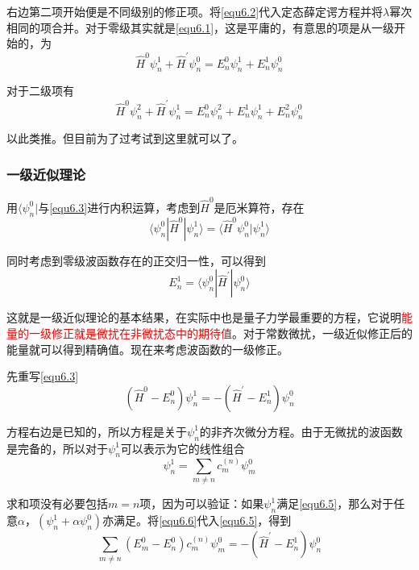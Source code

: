 \documentclass[UTF8]{ctexart}
\newcommand{\red}{\textcolor{red}}
\begin{document}
\noindent 右边第二项开始便是不同级别的修正项。将\autoref{equ6.2}代入定态薛定谔方程并将$\lambda$幂次相同的项合并。对于零级其实就是\autoref{equ6.1}，这是平庸的，有意思的项是从一级开始的，为
\begin{equation}
    \hat{H}^0 \psi_n^1 + \hat{H}^{\prime} \psi_n^0 = E_n^0\psi_n^1 + E_n^1\psi_n^0 \label{equ6.3}
\end{equation}

\noindent 对于二级项有
\begin{equation}
    \hat{H}^0 \psi_n^2 + \hat{H}^{\prime} \psi_n^1 = E_n^0\psi_n^2 + E_n^1\psi_n^1 + E_n^2 \psi_n^0 \label{equ6.4}
\end{equation}

\noindent 以此类推。但目前为了过考试到这里就可以了。

    \subsubsection{一级近似理论}
    用$\langle \psi_n^0 |$与\autoref{equ6.3}进行内积运算，考虑到$\hat{H}^0$是厄米算符，存在
    \begin{equation}
        \langle \psi_n^0 | \hat{H}^0 | \psi_n^1 \rangle = \langle \hat{H}^0 \psi_n^0 | \psi_n^1 \rangle
    \end{equation}

\noindent 同时考虑到零级波函数存在的正交归一性，可以得到
\begin{equation}
    E_n^1 = \langle \psi_n^0 | \hat{H}^{\prime}| \psi_{n}^{0} \rangle
\end{equation}

    这就是一级近似理论的基本结果，在实际中也是量子力学最重要的方程，它说明\red{能量的一级修正就是微扰在非微扰态中的期待值}。对于常数微扰，一级近似修正后的能量就可以得到精确值。现在来考虑波函数的一级修正。

    先重写\autoref{equ6.3}
    \begin{equation}
        (\hat{H}^0 - E_{n}^{0}) \psi_n^1 = -(\hat{H}^{\prime} - E_n^1)\psi_{n}^{0}\label{equ6.5}
    \end{equation}

\noindent 方程右边是已知的，所以方程是关于$\psi_n^1$的非齐次微分方程。由于无微扰的波函数是完备的，所以对于$\psi_n^1$可以表示为它的线性组合
\begin{equation}
    \psi_n^1 = \sum_{m \ne n} c^{(n)}_m \psi_m^0 \label{equ6.6}
\end{equation}

\noindent 求和项没有必要包括$m=n$项，因为可以验证：如果$\psi_n^1$满足\autoref{equ6.5}，那么对于任意$\alpha$，$(\psi_{n}^{1} + \alpha \psi_{n}^{0})$亦满足。将\autoref{equ6.6}代入\autoref{equ6.5}，得到
\begin{equation}
    \sum_{m \ne n} (E_m^0 - E_n^0 )c^{(n)}_m \psi_m^0 = - (\hat{H}^{\prime} - E_n^1)\psi_{n}^{0}
\end{equation}
\end{document}
